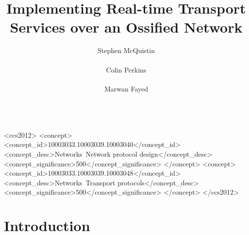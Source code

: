 \documentclass{sig-alternate-05-2015}
\begin{document}
\title{Implementing Real-time Transport Services over an Ossified Network}
\author{
  \alignauthor
    Stephen McQuistin\\
    \\
  \alignauthor
    Colin Perkins\\
    \\
  \alignauthor
    Marwan Fayed\\
    \\
}

\toappear{}
\maketitle
\begin{abstract}




\end{abstract}
\begin{CCSXML}
  <ccs2012>
    <concept>
      <concept_id>10003033.10003039.10003040</concept_id>
      <concept_desc>Networks~Network protocol design</concept_desc>
      <concept_significance>500</concept_significance>
    </concept>
    <concept>
      <concept_id>10003033.10003039.10003048</concept_id>
      <concept_desc>Networks~Transport protocols</concept_desc>
      <concept_significance>500</concept_significance>
    </concept>
  </ccs2012>
\end{CCSXML}


\printccsdesc

\section{Introduction}
\end{document}
